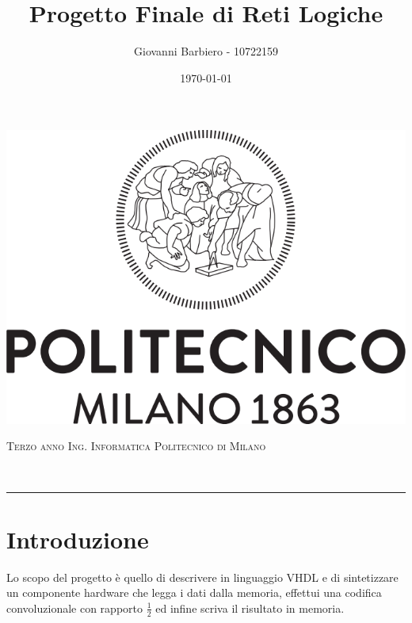 \documentclass[fleqn,11pt]{article}
\title{Progetto Finale di Reti Logiche}
\author{Giovanni Barbiero - 10722159}
\date{\today}
\makeatletter
\let\thetitle\@title
\let\theauthor\@author
\let\thedate\@date
\makeatother
\begin{document}
{
    \hfill
    \begin{minipage}{0.2\textwidth}
        \includegraphics[width=\linewidth]{logo}
    \end{minipage}
    \hfill
    \begin{minipage}{0.65\textwidth}
    \textsc{Terzo anno Ing. Informatica Politecnico di Milano}
    \end{minipage}
}
\\[0.4 cm]
\rule{\textwidth}{0.4pt}
{
    \LARGE
    \begin{center}
        \textbf{\thetitle}
    \end{center}
}
\begin{center}
    \Large
    \theauthor
\end{center}
\begin{center}
    \large
    \thedate
\end{center}


\section{Introduzione}
Lo scopo del progetto è quello di descrivere in linguaggio VHDL e di sintetizzare un componente hardware che legga i dati dalla memoria, effettui una codifica convoluzionale con rapporto \(\frac{1}{2}\) ed infine scriva il risultato in memoria.
\end{document}
